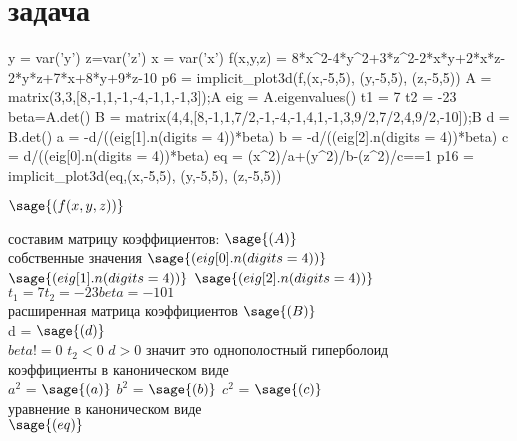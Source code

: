 \section{задача}
\begin {sagesilent}
y = var('y')
z=var('z')
x = var('x')
f(x,y,z) = 8*x^2-4*y^2+3*z^2-2*x*y+2*x*z-2*y*z+7*x+8*y+9*z-10
p6 = implicit_plot3d(f,(x,-5,5), (y,-5,5), (z,-5,5))
A = matrix(3,3,[8,-1,1,-1,-4,-1,1,-1,3]);A
eig = A.eigenvalues()
t1 = 7
t2 = -23
beta=A.det()
B = matrix(4,4,[8,-1,1,7/2,-1,-4,-1,4,1,-1,3,9/2,7/2,4,9/2,-10]);B
d = B.det()
a = -d/((eig[1].n(digits = 4))*beta)
b = -d/((eig[2].n(digits = 4))*beta)
c = d/((eig[0].n(digits = 4))*beta)
eq = (x^2)/a+(y^2)/b-(z^2)/c==1
p16 = implicit_plot3d(eq,(x,-5,5), (y,-5,5), (z,-5,5))
\end{sagesilent}
\large $\sage{(f(x,y,z))}$
\begin{center}
\end{center}
составим матрицу коэффициентов:
\large $\sage{(A)}$\\
собственные значения
$\sage{(eig[0].n(digits = 4))}$ $\sage{(eig[1].n(digits = 4))}$ $\sage{(eig[2].n(digits = 4))}$\\
$t_1 = 7  t_2 = -23 beta = -101$\\
расширенная матрица коэффициентов
$\sage{(B)}$\\
d = $\sage{(d)}$\\
$beta != 0$ $t_2<0$ $d>0$ значит это однополостный гиперболоид\\
коэффициенты в каноническом виде\\
$a^2$ = $\sage{(a)}$
$b^2$ = $\sage{(b)}$
$c^2$ = $\sage{(c)}$\\
уравнение в каноническом виде\\
$\sage{(eq)}$
\begin{center}
\end{center}
